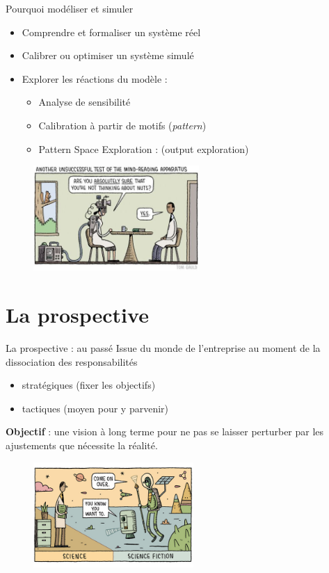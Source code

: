 \documentclass[newPxFont]{beamer}
\begin{document}
\begin{frame}[c]{Pourquoi modéliser et simuler}
  \vspace{-2em}
  \begin{itemize}
    \item Comprendre et formaliser un système réel
    \item Calibrer ou optimiser un système simulé
    \item Explorer les réactions du modèle :
    \begin{itemize}
      \item Analyse de sensibilité
      \item Calibration à partir de motifs (\textit{pattern})
      \item Pattern Space Exploration : (output exploration)
    \end{itemize}
  \end{itemize}
  \vspace{-1em}
  \begin{figure}
   \includegraphics[height=4cm]{img/a_gauld_nutts.jpg}
  \end{figure}
\end{frame}

%
%
\section{La prospective}

\begin{frame}[c]{La prospective : au passé}
  \vspace{-2em}
  Issue du monde de l'entreprise au moment de la dissociation des responsabilités
  \begin{itemize}
    \item stratégiques (fixer les objectifs)
    \item tactiques (moyen pour y parvenir)
  \end{itemize}
  \textbf{Objectif} : une vision à long terme pour ne pas se laisser perturber par les ajustements que nécessite la réalité.
  \begin{figure}
   \includegraphics[height=4cm]{img/a_gauld_tom_new_scientist.jpg}
  \end{figure}
\end{frame}
\end{document}

